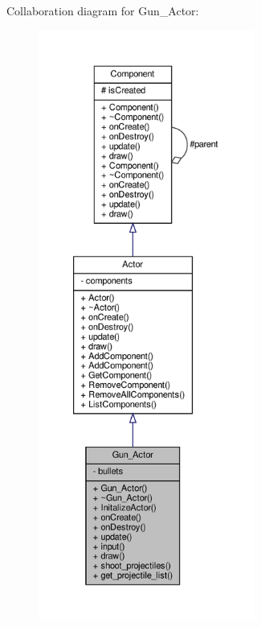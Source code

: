 Collaboration diagram for Gun\+\_\+\+Actor\+:
\nopagebreak
\begin{figure}[H]
\begin{center}
\leavevmode
\includegraphics[height=550pt]{classGun__Actor__coll__graph}
\end{center}
\end{figure}
